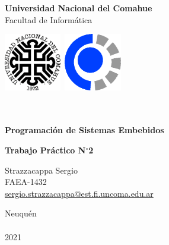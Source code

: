 \titlepage

\begin{center}

    \vspace{-1cm}

    {\Large{\bf \sc Universidad Nacional del Comahue}} \\
    {\Large{\sc Facultad de Informática}}

    \vspace{-2.5cm}

    \mbox{\includegraphics[width=2.5cm,height=2.5cm]{img/caratula/unc.png}\hspace{10cm} \includegraphics[width=2.5cm,height=2.5cm]{img/caratula/fai.png}}

    \vspace{1cm}

    \ \\
    \ \\

    {\Large {\bf \sc Programación de Sistemas Embebidos}} \\

    \vspace{2cm}

    {\LARGE {\bf \sc Trabajo Práctico N$^\circ$2}} \\

    \vspace{1.5cm}

    {\Large Strazzacappa Sergio} \\
    \vspace{1.5em}
    {\Large FAEA-1432} \\
    \vspace{1.5em}
    {\Large \href{mailto:sergio.strazzacappa@est.fi.uncoma.edu.ar}{sergio.strazzacappa@est.fi.uncoma.edu.ar}}

    \vfill

    {\Large {\sc Neuqu\'en}\hspace{6cm}{\sc Argentina}} \\ \ \\

    {\Large 2021} \\

    \pagebreak

\end{center}
